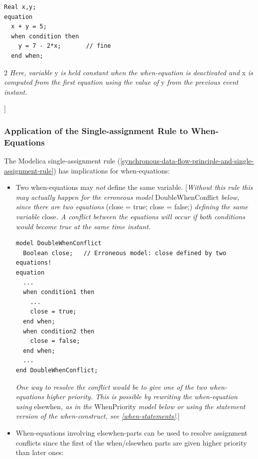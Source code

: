 \documentclass[10pt,a4paper]{report}
\def\doublelabel#1{\label{#1}}
\begin{document}
\begin{lstlisting}[language=modelica]
  Real x,y; 
equation   
  x + y = 5;   
  when condition then     
    y = 7 - 2*x;       // fine  
  end when;
\end{lstlisting}
2
\emph{Here, variable} y \emph{is held constant when the when-equation is
deactivated and} x \emph{is computed from the first equation using the
value of} y \emph{from the previous event instant.}

{]}

\subsubsection{Application of the Single-assignment Rule to When-Equations}\doublelabel{application-of-the-single-assignment-rule-to-when-equations}

The Modelica single-assignment rule (\ref{synchronous-data-flow-principle-and-single-assignment-rule}) has implications for
when-equations:

\begin{itemize}
\item Two when-equations may \emph{not} define the same variable.
{[}\emph{Without this rule this may actually happen for the erroneous
model} DoubleWhenConflict \emph{below, since there are two equations}
(close = true; close = false;) \emph{defining the same variable}
close\emph{. A conflict between the equations will occur if both
conditions would become true at the same time instant.}

\begin{lstlisting}[language=modelica]
model DoubleWhenConflict   
  Boolean close;   // Erroneous model: close defined by two equations! 
equation   
  ...   
  when condition1 then 
    ...
    close = true;   
  end when;   
  when condition2 then     
    close = false;   
  end when;   
  ... 
end DoubleWhenConflict;
\end{lstlisting}

\emph{One way to resolve the conflict would be to give one of the two
when-equations higher priority. This is possible by rewriting the
when-equation using} elsewhen\emph{, as in the} WhenPriority \emph{model
below or using the statement version of the when-construct, see \ref{when-statements}}.{]}

\item
  When-equations involving elsewhen-parts can be used to resolve
  assignment conflicts since the first of the when/elsewhen parts are
  given higher priority than later ones:
\end{itemize}
\end{document}
